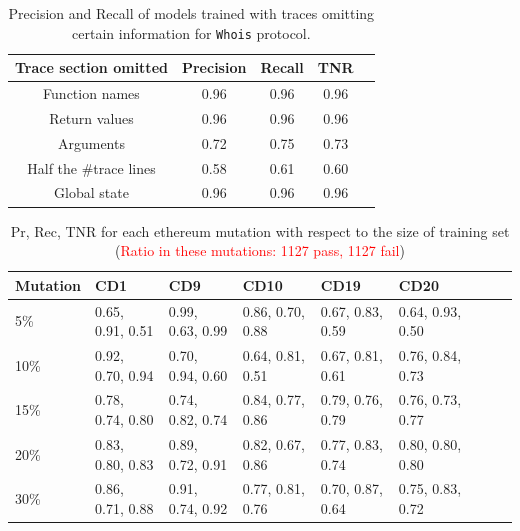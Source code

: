 \begin{table}[]
\centering
\begin{tabular}{|c|c|c|c|c|}
	\hline
	Trace section omitted   & {Precision} & {Recall} & TNR\\ 
	\hline \hline
	Function names  & 0.96 & 0.96 & 0.96 \\ \hline 
	Return values & 0.96 & 0.96 & 0.96 \\ \hline
	Arguments & 0.72  & 0.75 & 0.73 \\ \hline
	Half the \#trace lines & 0.58 & 0.61 & 0.60 \\ \hline
	Global state & 0.96 & 0.96 & 0.96 \\ \hline 
\end{tabular}
\caption{Precision and Recall of models trained with traces omitting certain information for \texttt{Whois} protocol. }
\label{tab:whois_removed_trace}
\end{table}

\fi

\iffalse
\begin{table}[]
\centering
\small
\begin{tabular}{|l|l|l|l|l|l@{\hskip 5mm}|l|l|l|}
	\hline
	Mutation & CD1 & CD9 & CD10 & CD19 & CD20 \\ 
	\hline
	5\% & 0.65, 0.91, 0.51 & 0.99, 0.63, 0.99 & 0.86, 0.70, 0.88 & 0.67, 0.83, 0.59 & 0.64, 0.93, 0.50  \\ \hline
	10\% & 0.92, 0.70, 0.94 & 0.70, 0.94, 0.60 & 0.64, 0.81, 0.51 & 0.67, 0.81, 0.61 & 0.76, 0.84, 0.73 \\ \hline
	15\% & 0.78, 0.74, 0.80 & 0.74, 0.82, 0.74 & 0.84, 0.77, 0.86 & 0.79, 0.76, 0.79 & 0.76, 0.73, 0.77 \\ \hline
	20\% & 0.83, 0.80, 0.83 & 0.89, 0.72, 0.91 & 0.82, 0.67, 0.86 & 0.77, 0.83, 0.74 & 0.80, 0.80, 0.80 \\ \hline
	30\% & 0.86, 0.71, 0.88 & 0.91, 0.74, 0.92 & 0.77, 0.81, 0.76 & 0.70, 0.87, 0.64 & 0.75, 0.83, 0.72 \\
	\hline
\end{tabular}
\caption{Pr, Rec, TNR for each ethereum mutation with respect to the size of training set (\textcolor{red}{Ratio in these mutations: 1127 pass, 1127 fail})}
\vspace{-20pt}
\label{tab:eth-1}
\end{table}



